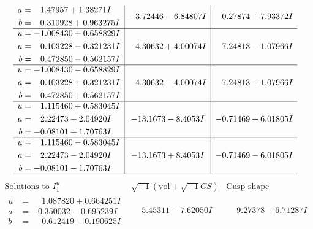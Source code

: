 \documentclass[1p]{elsarticle_modified}
\theoremstyle{definition}
\newcommand{\I}{\sqrt{-1}}
\begin{document}
$$\begin{array}{c|c|c}
\begin{aligned}
a &= \phantom{-}1.47957 + 1.38271 I \\
b &= -0.310928 + 0.963275 I\end{aligned}
 & -3.72446 - 6.84807 I & \phantom{-}0.27874 + 7.93372 I \\ \hline\begin{aligned}
u &= -1.008430 + 0.658829 I \\
a &= \phantom{-}0.103228 - 0.321231 I \\
b &= \phantom{-}0.472850 - 0.562157 I\end{aligned}
 & \phantom{-}4.30632 + 4.00074 I & \phantom{-}7.24813 - 1.07966 I \\ \hline\begin{aligned}
u &= -1.008430 - 0.658829 I \\
a &= \phantom{-}0.103228 + 0.321231 I \\
b &= \phantom{-}0.472850 + 0.562157 I\end{aligned}
 & \phantom{-}4.30632 - 4.00074 I & \phantom{-}7.24813 + 1.07966 I \\ \hline\begin{aligned}
u &= \phantom{-}1.115460 + 0.583045 I \\
a &= \phantom{-}2.22473 + 2.04920 I \\
b &= -0.08101 + 1.70763 I\end{aligned}
 & -13.1673 - 8.4053 I & -0.71469 + 6.01805 I \\ \hline\begin{aligned}
u &= \phantom{-}1.115460 - 0.583045 I \\
a &= \phantom{-}2.22473 - 2.04920 I \\
b &= -0.08101 - 1.70763 I\end{aligned}
 & -13.1673 + 8.4053 I & -0.71469 - 6.01805 I\\
 \hline 
 \end{array}$$\newpage$$\begin{array}{c|c|c}  
\text{Solutions to }I^u_{1}& \I (\text{vol} + \sqrt{-1}CS) & \text{Cusp shape}\\
 \hline 
\begin{aligned}
u &= \phantom{-}1.087820 + 0.664251 I \\
a &= -0.350032 - 0.695239 I \\
b &= \phantom{-}0.612419 - 0.190625 I\end{aligned}
 & \phantom{-}5.45311 - 7.62050 I & \phantom{-}9.27378 + 6.71287 I \\ \hline\begin{aligned}

\end{aligned}
\end{array}$$
\end{document}
